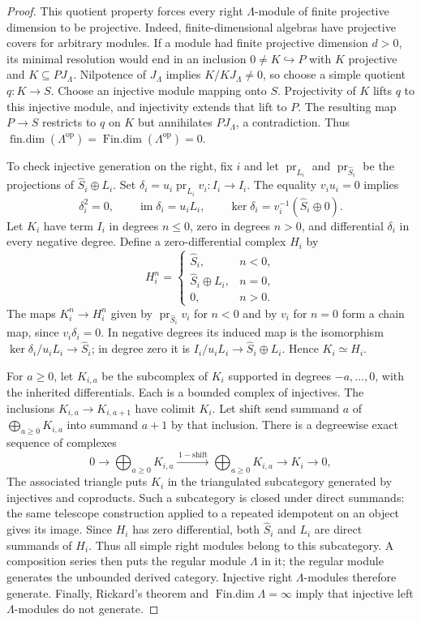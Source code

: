 \documentclass[11pt]{article}
\numberwithin{equation}{section}
\theoremstyle{definition}
\theoremstyle{remark}
\DeclareMathOperator{\findim}{fin.dim}
\DeclareMathOperator{\Findim}{Fin.dim}
\begin{document}
\begin{proof}
This quotient property forces every right $\Lambda$-module of finite
projective dimension to be projective. Indeed, finite-dimensional
algebras have projective covers for arbitrary modules. If a module
had finite projective dimension $d>0$, its minimal resolution would
end in an inclusion $0\ne K\hookrightarrow P$ with $K$ projective
and $K\subseteq PJ_\Lambda$. Nilpotence of $J_\Lambda$ implies
$K/KJ_\Lambda\ne0$, so choose a simple quotient $q:K\to S$.
Choose an injective module mapping onto $S$. Projectivity of $K$
lifts $q$ to this injective module, and injectivity extends that lift
to $P$. The resulting map $P\to S$ restricts to $q$ on $K$ but
annihilates $PJ_\Lambda$, a contradiction. Thus
$\findim(\Lambda^{\mathrm{op}})=\Findim(\Lambda^{\mathrm{op}})=0$.

To check injective generation on the right, fix $i$ and let
$\operatorname{pr}_{L_i}$ and $\operatorname{pr}_{\widehat S_i}$
be the projections of $\widehat S_i\oplus L_i$. Set
$\delta_i=u_i\operatorname{pr}_{L_i}v_i:I_i\to I_i$.
The equality $v_iu_i=0$ implies
\[
 \delta_i^2=0,\qquad
 \operatorname{im}\delta_i=u_iL_i,\qquad
 \ker\delta_i=v_i^{-1}(\widehat S_i\oplus0).
\]
Let $K_i$ have term $I_i$ in degrees $n\le0$, zero in degrees
$n>0$, and differential $\delta_i$ in every negative degree.
Define a zero-differential complex $H_i$ by
\[
 H_i^n=\begin{cases}
 \widehat S_i,&n<0,\\
 \widehat S_i\oplus L_i,&n=0,\\
 0,&n>0.
 \end{cases}
\]
The maps $K_i^n\to H_i^n$ given by
$\operatorname{pr}_{\widehat S_i}v_i$ for $n<0$ and by $v_i$
for $n=0$ form a chain map, since $v_i\delta_i=0$.
In negative degrees its induced map is the isomorphism
$\ker\delta_i/u_iL_i\to\widehat S_i$; in degree zero it is
$I_i/u_iL_i\to\widehat S_i\oplus L_i$. Hence $K_i\simeq H_i$.

For $a\ge0$, let $K_{i,a}$ be the subcomplex of $K_i$ supported
in degrees $-a,\ldots,0$, with the inherited differentials.
Each is a bounded complex of injectives. The inclusions
$K_{i,a}\to K_{i,a+1}$ have colimit $K_i$. Let $\mathrm{shift}$
send summand $a$ of $\bigoplus_{a\ge0}K_{i,a}$ into summand $a+1$
by that inclusion. There is a degreewise exact sequence of complexes
\[
 0\longrightarrow\bigoplus_{a\ge0}K_{i,a}
 \xrightarrow{\,1-\mathrm{shift}\,}\bigoplus_{a\ge0}K_{i,a}
 \longrightarrow K_i\longrightarrow0,
\]
The associated triangle puts $K_i$ in the
triangulated subcategory generated by injectives and coproducts.
Such a subcategory is closed under direct summands: the same
telescope construction applied to a repeated idempotent on an
object gives its image. Since $H_i$ has zero differential, both
$\widehat S_i$ and $L_i$ are direct summands of $H_i$.
Thus all simple right modules belong to this subcategory. A
composition series then puts the regular module $\Lambda$ in it;
the regular module generates the unbounded derived category.
Injective right $\Lambda$-modules therefore generate.
Finally, Rickard's theorem and $\Findim\Lambda=\infty$ imply
that injective left $\Lambda$-modules do not generate.
\end{proof}
\end{document}

